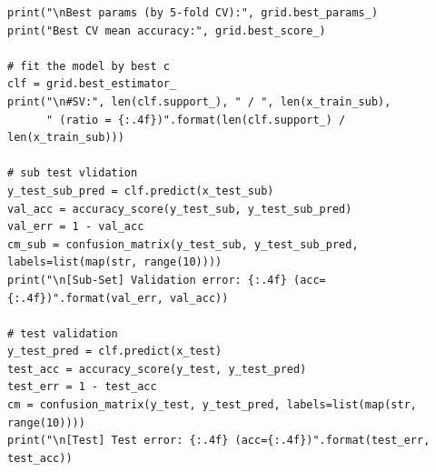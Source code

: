 \documentclass[11pt, reqno, letterpaper, twoside]{amsart}
\theoremstyle{plain}
\theoremstyle{definition}
\begin{document}
\begin{lstlisting}
print("\nBest params (by 5-fold CV):", grid.best_params_)
print("Best CV mean accuracy:", grid.best_score_)

# fit the model by best c
clf = grid.best_estimator_
print("\n#SV:", len(clf.support_), " / ", len(x_train_sub),
      " (ratio = {:.4f})".format(len(clf.support_) / len(x_train_sub)))

# sub test vlidation
y_test_sub_pred = clf.predict(x_test_sub)
val_acc = accuracy_score(y_test_sub, y_test_sub_pred)
val_err = 1 - val_acc
cm_sub = confusion_matrix(y_test_sub, y_test_sub_pred, labels=list(map(str, range(10))))
print("\n[Sub-Set] Validation error: {:.4f} (acc={:.4f})".format(val_err, val_acc))

# test validation
y_test_pred = clf.predict(x_test)
test_acc = accuracy_score(y_test, y_test_pred)
test_err = 1 - test_acc
cm = confusion_matrix(y_test, y_test_pred, labels=list(map(str, range(10))))
print("\n[Test] Test error: {:.4f} (acc={:.4f})".format(test_err, test_acc))
\end{lstlisting}
\end{document}
